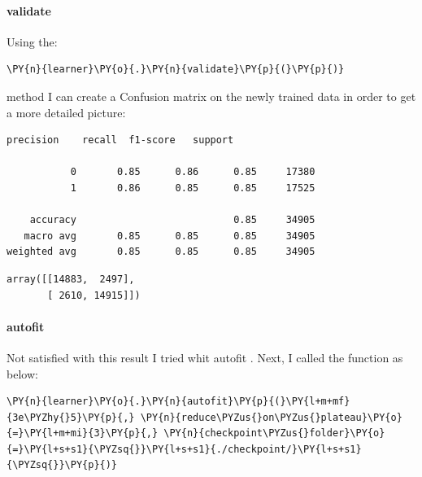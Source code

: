 \paragraph{validate}
Using the:
    \begin{tcolorbox}[breakable, size=fbox, boxrule=1pt, pad at break*=1mm,colback=cellbackground, colframe=cellborder]
\begin{Verbatim}[commandchars=\\\{\},fontsize=\footnotesize]
\PY{n}{learner}\PY{o}{.}\PY{n}{validate}\PY{p}{(}\PY{p}{)}
\end{Verbatim}
\end{tcolorbox}method I can create a \gls{Confusion matrix} on the newly trained data in order to get a more detailed picture:
    \begin{Verbatim}[commandchars=\\\{\},fontsize=\footnotesize]
              precision    recall  f1-score   support

           0       0.85      0.86      0.85     17380
           1       0.86      0.85      0.85     17525

    accuracy                           0.85     34905
   macro avg       0.85      0.85      0.85     34905
weighted avg       0.85      0.85      0.85     34905

    \end{Verbatim}
            \begin{tcolorbox}[breakable, size=fbox, boxrule=.5pt, pad at break*=1mm, opacityfill=0]
\begin{Verbatim}[commandchars=\\\{\},fontsize=\footnotesize]
array([[14883,  2497],
       [ 2610, 14915]])
\end{Verbatim}
\end{tcolorbox}
        

\paragraph{autofit}
Not satisfied with this result I tried whit autofit \cite{noauthor_amaiyaktrainautofit_nodate}.
Next, I called the function as below:
    \begin{tcolorbox}[breakable, size=fbox, boxrule=1pt, pad at break*=1mm,colback=cellbackground, colframe=cellborder]
\begin{Verbatim}[commandchars=\\\{\},fontsize=\footnotesize]
\PY{n}{learner}\PY{o}{.}\PY{n}{autofit}\PY{p}{(}\PY{l+m+mf}{3e\PYZhy{}5}\PY{p}{,} \PY{n}{reduce\PYZus{}on\PYZus{}plateau}\PY{o}{=}\PY{l+m+mi}{3}\PY{p}{,} \PY{n}{checkpoint\PYZus{}folder}\PY{o}{=}\PY{l+s+s1}{\PYZsq{}}\PY{l+s+s1}{./checkpoint/}\PY{l+s+s1}{\PYZsq{}}\PY{p}{)}
\end{Verbatim}
\end{tcolorbox}

